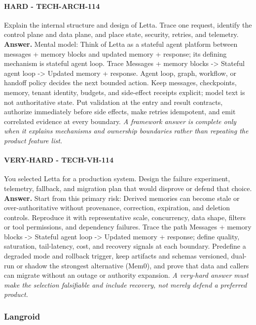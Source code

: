 \paragraph{HARD - TECH-ARCH-114} Explain the internal structure and design of Letta. Trace one request, identify the control plane and data plane, and place state, security, retries, and telemetry.
\textbf{Answer.} Mental model: Think of Letta as a stateful agent platform between messages + memory blocks and updated memory + response; its defining mechanism is stateful agent loop. Trace Messages + memory blocks -> Stateful agent loop -> Updated memory + response. Agent loop, graph, workflow, or handoff policy decides the next bounded action. Keep messages, checkpoints, memory, tenant identity, budgets, and side-effect receipts explicit; model text is not authoritative state. Put validation at the entry and result contracts, authorize immediately before side effects, make retries idempotent, and emit correlated evidence at every boundary.
\textit{A framework answer is complete only when it explains mechanisms and ownership boundaries rather than repeating the product feature list.}
\paragraph{VERY-HARD - TECH-VH-114} You selected Letta for a production system. Design the failure experiment, telemetry, fallback, and migration plan that would disprove or defend that choice.
\textbf{Answer.} Start from this primary risk: Derived memories can become stale or over-authoritative without provenance, correction, expiration, and deletion controls. Reproduce it with representative scale, concurrency, data shape, filters or tool permissions, and dependency failures. Trace the path Messages + memory blocks -> Stateful agent loop -> Updated memory + response; define quality, saturation, tail-latency, cost, and recovery signals at each boundary. Predefine a degraded mode and rollback trigger, keep artifacts and schemas versioned, dual-run or shadow the strongest alternative (Mem0), and prove that data and callers can migrate without an outage or authority expansion.
\textit{A very-hard answer must make the selection falsifiable and include recovery, not merely defend a preferred product.}
\subsubsection*{Langroid}
